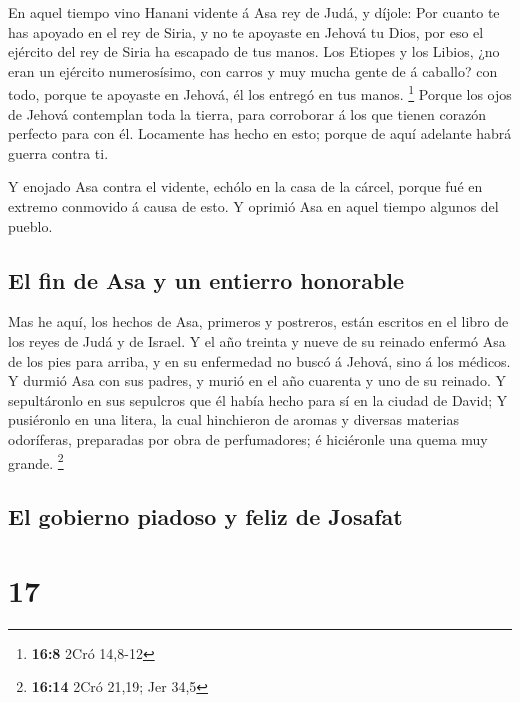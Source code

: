  En aquel tiempo vino Hanani vidente á Asa rey de Judá, y
díjole: Por cuanto te has apoyado en el rey de Siria, y no te apoyaste
en Jehová tu Dios, por eso el ejército del rey de Siria ha escapado de
tus manos.  Los Etiopes y los Libios, ¿no eran un ejército
numerosísimo, con carros y muy mucha gente de á caballo? con todo,
porque te apoyaste en Jehová, él los entregó en tus manos. \footnote{\textbf{16:8}
  2Cró 14,8-12}  Porque los ojos de Jehová contemplan toda
la tierra, para corroborar á los que tienen corazón perfecto para con
él. Locamente has hecho en esto; porque de aquí adelante habrá guerra
contra ti.

 Y enojado Asa contra el vidente, echólo en la casa de la
cárcel, porque fué en extremo conmovido á causa de esto. Y oprimió Asa
en aquel tiempo algunos del pueblo.

\hypertarget{el-fin-de-asa-y-un-entierro-honorable}{%
\subsection{El fin de Asa y un entierro
honorable}\label{el-fin-de-asa-y-un-entierro-honorable}}

 Mas he aquí, los hechos de Asa, primeros y postreros,
están escritos en el libro de los reyes de Judá y de Israel.
 Y el año treinta y nueve de su reinado enfermó Asa de los
pies para arriba, y en su enfermedad no buscó á Jehová, sino á los
médicos.  Y durmió Asa con sus padres, y murió en el año
cuarenta y uno de su reinado.  Y sepultáronlo en sus
sepulcros que él había hecho para sí en la ciudad de David; Y pusiéronlo
en una litera, la cual hinchieron de aromas y diversas materias
odoríferas, preparadas por obra de perfumadores; é hiciéronle una quema
muy grande. \footnote{\textbf{16:14} 2Cró 21,19; Jer 34,5}

\hypertarget{el-gobierno-piadoso-y-feliz-de-josafat}{%
\subsection{El gobierno piadoso y feliz de
Josafat}\label{el-gobierno-piadoso-y-feliz-de-josafat}}

\hypertarget{section-16}{%
\section{17}\label{section-16}}

